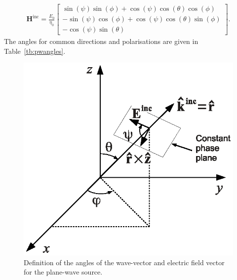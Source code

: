 \documentclass[onecolumn,a4paper]{article}
\numberwithin{equation}{section}
\begin{document}
\begin{eqnarray}
\mathbf{H}^\mathrm{inc}
= \frac{E_0}{\eta_0} \left[
\begin{array}{c}
 \sin( \psi ) \sin( \phi ) + \cos( \psi ) \cos( \theta ) \cos( \phi ) \\
-\sin( \psi ) \cos( \phi ) + \cos( \psi ) \cos( \theta ) \sin( \phi ) \\
-\cos( \psi ) \sin( \theta )
\end{array}
\right].
\label{eq:Hinc}
\end{eqnarray}
The angles for common directions and polarisations are given in Table~\ref{tb:pwangles}. 

\begin{figure}[ht]
  \begin{center}
   \includegraphics[width=0.4\linewidth]{figures/planewave}
  \end{center}
  \caption{\label{fg:pw}Definition of the angles of the wave-vector and electric field vector for the plane-wave source.}
\end{figure}
\end{document}
